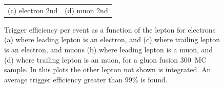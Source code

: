 \begin{figure}[htbp]
\begin{tabular}{cc}
 (c) electron 2nd & (d) muon 2nd \\
\end{tabular}
\caption{
      Trigger efficiency per event
      as a function of the lepton \pt
      for electrons (a) where leading lepton is an electron, 
      and (c) where trailing lepton is an electron, 
      and muons (b) where leading lepton is a muon, 
      and (d) where trailing lepton is an muon, 
      for a gluon fusion 300~\GeV MC sample.
      In this plots the other lepton not shown is
      integrated.
      An average trigger efficiency greater than 99\% is found.      
     }
    \label{Fig:trigger}
\end{figure}

%     
%     




